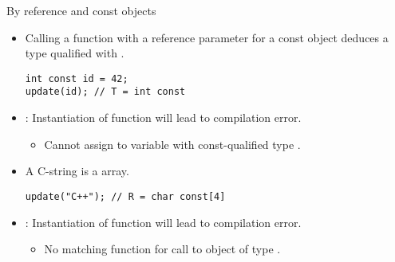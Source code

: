 \begin{frame}[t,fragile]{By reference and const objects}
\begin{itemize}
  \item Calling a function with a reference parameter for a const object deduces
        a type qualified with .
\begin{lstlisting}
int const id = 42;
update(id); // T = int const
\end{lstlisting}

  \item {}: Instantiation of function will lead to compilation error.
    \begin{itemize}
      \item Cannot assign to variable  with const-qualified type .
    \end{itemize}

  \item A C-string is a  array.
\begin{lstlisting}
update("C++"); // R = char const[4]
\end{lstlisting}
  \item {}: Instantiation of function will lead to compilation error.
    \begin{itemize}
      \item No matching function for call to object of type  .
    \end{itemize}
\end{itemize}
\end{frame}
